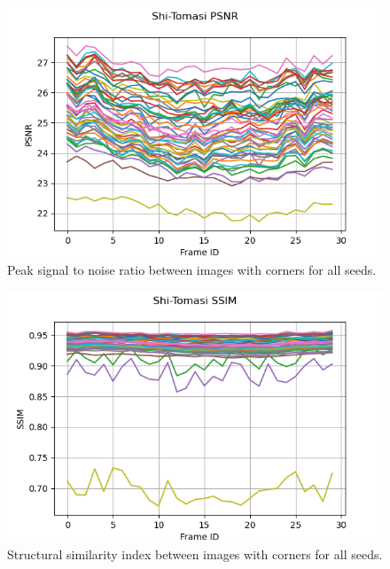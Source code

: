 \documentclass[11pt, conference, letterpaper]{IEEEtran}
\begin{document}
\begin{figure}[h!]
    \centering
    \includegraphics[width=\linewidth]{mc_images/mc_stc_psnr.png}
    \caption{Peak signal to noise ratio between images with corners for all seeds.}
    \label{fig:mc_stc_psnr}
\end{figure}

\begin{figure}[h!]
    \centering
    \includegraphics[width=\linewidth]{mc_images/mc_stc_ssim.png}
    \caption{Structural similarity index between images with corners for all seeds.}
    \label{fig:mc_stc_ssim}
\end{figure}
\end{document}
